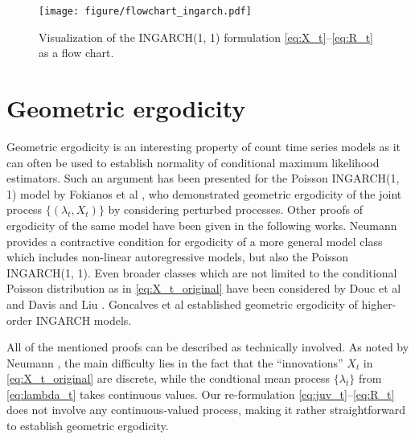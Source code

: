 \documentclass[10pt,a4paper]{article}
\begin{document}
\begin{figure}[h!]
\texttt{[image: figure/flowchart\_ingarch.pdf]}
\caption{Visualization of the INGARCH(1, 1) formulation \eqref{eq:X_t}--\eqref{eq:R_t}  as a flow chart.}
\label{fig:ingarch_flowchart}
\end{figure}



\section{Geometric ergodicity}

Geometric ergodicity is an interesting property of count time series models as it can often be used to establish normality of conditional maximum likelihood estimators. Such an argument has been presented for the Poisson INGARCH(1, 1) model by Fokianos et al \cite{Fokianos2009}, who demonstrated geometric ergodicity of the joint process $\{(\lambda_t, X_t)\}$ by considering perturbed processes. Other proofs of ergodicity of the same model have been given in the following works. Neumann \citep{Neumann2011} provides a contractive condition for ergodicity of a more general model class which includes non-linear autoregressive models, but also the Poisson INGARCH(1, 1). Even broader classes which are not limited to the conditional Poisson distribution as in \eqref{eq:X_t_original} have been considered by Douc et al \citep{Douc2013} and Davis and Liu \cite{Davis2016}. Goncalves et al \cite{Goncalves2015} established geometric ergodicity of higher-order INGARCH models.

All of the mentioned proofs can be described as technically involved. As noted by Neumann \cite{Neumann2011}, the main difficulty lies in the fact that the ``innovations'' $X_t$ in \eqref{eq:X_t_original} are discrete, while the condtional mean process $\{\lambda_t\}$ from \eqref{eq:lambda_t} takes continuous values. Our re-formulation \eqref{eq:juv_t}--\eqref{eq:R_t} does not involve any continuous-valued process, making it rather straightforward to establish geometric ergodicity.
\end{document}
